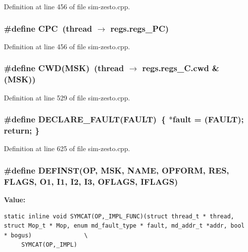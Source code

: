 Definition at line 456 of file sim-zesto.cpp.
\subsubsection[{CPC}]{\setlength{\rightskip}{0pt plus 5cm}\#define CPC~(thread $\rightarrow$ regs.regs\_\-PC)}\label{sim-zesto_8cpp_47928f393a8ffdecfa07271f22beb34b}




Definition at line 456 of file sim-zesto.cpp.
\subsubsection[{CWD}]{\setlength{\rightskip}{0pt plus 5cm}\#define CWD(MSK)~(thread $\rightarrow$ regs.regs\_\-C.cwd \& (MSK))}\label{sim-zesto_8cpp_9fbb923f79e2e5cdd6c74c94705b21cb}




Definition at line 529 of file sim-zesto.cpp.
\subsubsection[{DECLARE\_\-FAULT}]{\setlength{\rightskip}{0pt plus 5cm}\#define DECLARE\_\-FAULT(FAULT)~\{ $\ast$fault = (FAULT); return; \}}\label{sim-zesto_8cpp_598ae1e60cce3e06a2f531d8a3de36a1}




Definition at line 625 of file sim-zesto.cpp.
\subsubsection[{DEFINST}]{\setlength{\rightskip}{0pt plus 5cm}\#define DEFINST(OP, \/  MSK, \/  NAME, \/  OPFORM, \/  RES, \/  FLAGS, \/  O1, \/  I1, \/  I2, \/  I3, \/  OFLAGS, \/  IFLAGS)}\label{sim-zesto_8cpp_0d06a1978d25d25a08e7365790bb9cea}


\textbf{Value:}

\begin{Code}\begin{verbatim}static inline void SYMCAT(OP,_IMPL_FUNC)(struct thread_t * thread, struct Mop_t * Mop, enum md_fault_type * fault, md_addr_t *addr, bool * bogus)               \
     SYMCAT(OP,_IMPL)
\end{verbatim}
\end{Code}


